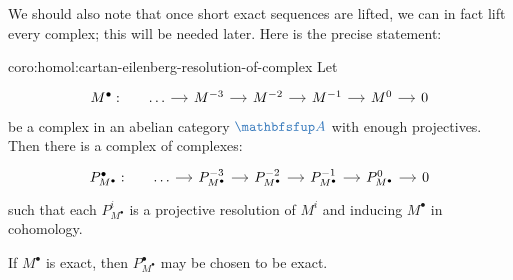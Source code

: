 We should also note that once short exact sequences are lifted, we can
in fact lift every complex; this will be needed later. Here is the
precise statement:
\begin{coro}{}{coro:homol:cartan-eilenberg-resolution-of-complex}
  Let
  \[\begin{tikzcd}[column sep=small]
      M^\bullet: & \dots \arrow[r] & M^{-3} \arrow[r] & M^{-2}
      \arrow[r] & M^{-1} \arrow[r] & M^0 \arrow[r] & 0
    \end{tikzcd}\] be a complex in an abelian category $\categ{A}$
  with enough projectives. Then there is a complex of complexes:
  \[\begin{tikzcd}[column sep=small]
      P_{M^\bullet}^\bullet: & \dots \arrow[r] & P_{M^\bullet}^{-3}
      \arrow[r] & P_{M^\bullet}^{-2} \arrow[r] & P_{M^\bullet}^{-1}
      \arrow[r] & P_{M^\bullet}^0 \arrow[r] & 0
    \end{tikzcd}\] such that each $P_{M^\bullet}^i$ is a projective
  resolution of $M^i$ and inducing $M^\bullet$ in cohomology.

  If $M^\bullet$ is exact, then $P_{M^\bullet}^\bullet$ may be chosen
  to be exact.
\end{coro}
